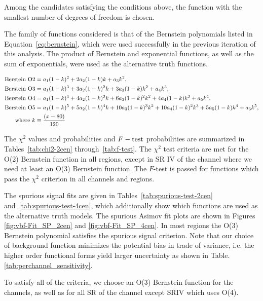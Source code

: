  Among the candidates satisfying the conditions above, the function with the smallest
number of degrees of freedom is chosen.


The family of functions considered is that of the Bernstein polynomials listed in Equation~\ref{eq:bernstein}, which were
used successfully in the previous iteration of this analysis.  The product of Bernstein and exponential functions, as well as the sum of exponentials, were used as the alternative truth functions. 

\begin{equation}
\label{eq:bernstein}
\begin{aligned}
\textnormal{Berstein O2} &= a_1(1-k)^2 + 2a_2(1-k)k + a_3k^2, \\
\textnormal{Berstein O3} &= a_1(1-k)^3 + 3a_2(1-k)^2k + 3a_3(1-k)k^2 + a_4k^3, \\
\textnormal{Berstein O4} &= a_1(1-k)^4 + 4a_2(1-k)^3k + 6a_3(1-k)^2k^2 + 4a_4(1-k)k^3 + a_5k^4,\\
\textnormal{Berstein O5} &= a_1(1-k)^5 + 5a_2(1-k)^4k + 10a_3(1-k)^3k^2 + 10a_4(1-k)^2k^3 + 5a_5(1-k)k^4 +a_6k^5, \\
\textnormal{where } k &\equiv \frac{(x-80)}{120}
\end{aligned}
\end{equation}


The $\chi^2$ values and probabilities and $F-\rm{test}$ probabilities are summarized in Tables~\ref{tab:chi2-2cen} through~\ref{tab:f-test}. The $\chi^2$ test criteria are met for the O(2) Bernstein function in all regions, except in 
SR IV of the \fourcentral channel where we need at least an O(3) Bernstein function. The $F$-test is passed for functions which pass the $\chi^2$ criterion in all channels and regions.

The spurious signal fits are given in Tables~\ref{tab:spurious-test-2cen} and~\ref{tab:spurious-test-4cen}, which additionally show which functions are used as the alternative truth models.  The spurious Asimov fit plots are shown in Figures \ref{fig:vbf-Fit_SP_2cen} and \ref{fig:vbf-Fit_SP_4cen}. In most regions the O(3) Bernstein polynomial satisfies the spurious signal criterion. Note that our choice of background function minimizes the potential bias in trade of variance, i.e. the higher order functional forms yield larger uncertainty as shown in Table. \ref{tab:perchannel_sensitivity}.

To satisfy all of the criteria, we choose an O(3) Bernstein function for the \twocentral channels, as well as for all SR of the \fourcentral channel except SRIV which uses O(4).  


